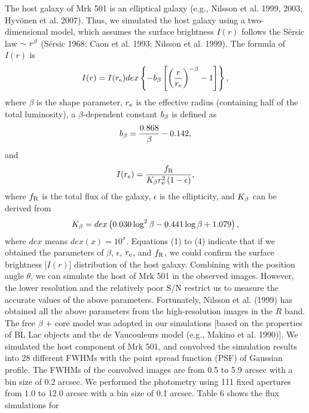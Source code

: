 \documentclass[structabstract]{raa}
\begin{document}
   The host galaxy of Mrk 501 is an elliptical galaxy (e.g., Nilsson et al. 1999, 2003; Hyv\"{o}nen et al. 2007). Thus, we simulated
   the host galaxy using a two-dimensional model, which assumes the surface brightness $I(r)$ follows the S\'{e}rsic law
   $\sim r^{\rm{\beta}}$ (S\'{e}rsic 1968; Caon et al. 1993; Nilsson et al. 1999). The formula of $I(r)$  is
   \begin{equation}
   I(r)=I(r_{\rm{e}}) dex \left\{ -b_{\beta} \left[ \left( \frac{r}{r_{\rm{e}}} \right)^{-\beta}-1 \right] \right\},
   \end{equation}
   where $\beta$ is the shape parameter, $r_{\rm{e}}$ is the effective radius (containing half of the total luminosity), a $\beta$-dependent
    constant $b_{\rm{\beta}}$ is defined as
   \begin{equation}
   b_{\rm{\beta}}=\frac{0.868}{\beta}-0.142,
   \end{equation}
   and
   \begin{equation}
   I(r_{\rm{e}}) = \frac{f_{\rm{R}}}{K_{\rm{\beta}} r^{2}_{\rm{e}} \left(1-\epsilon \right)},
   \end{equation}
   where $f_{\rm{R}}$ is the total flux of the galaxy, $\epsilon$ is the ellipticity, and $K_{\rm{\beta}}$ can be derived from
   \begin{equation}
   K_{\rm{\beta}}=dex \left(0.030 \log^2 \beta - 0.441 \log \beta+1.079 \right),
   \end{equation}
   where $dex$ means $dex(x)=10^x$. Equations (1) to (4) indicate that if we obtained the parameters of $\beta$,
   $\epsilon$, $r_{\rm{e}}$, and $f_{\rm{R}}$, we could confirm the surface brightness [$I(r)$] distribution of the host
   galaxy. Combining with the position angle $\theta$, we can simulate the host of Mrk 501 in the observed images.
   However, the lower resolution and the relatively poor S/N restrict us to measure the accurate values of the above
   parameters. Fortunately, Nilsson et al. (1999) has obtained all the above parameters from the high-resolution images
   in the $R$ band. The free $\beta$ + core model was adopted in our simulations [based on the properties of BL Lac
   objects and the de Vaucouleurs model (e.g., Makino et al. 1990)]. We simulated the host component of Mrk 501, and
   convolved the simulation results into 28 different FWHMs with the point spread function (PSF) of Gaussian profile. The
   FWHMs of the convolved images are from 0.5 to 5.9 arcsec with a bin size of 0.2 arcsec. We performed the photometry
   using 111 fixed apertures from 1.0 to 12.0 arcsec with a bin size of 0.1 arcsec. Table 6 shows the flux simulations for
\end{document}
